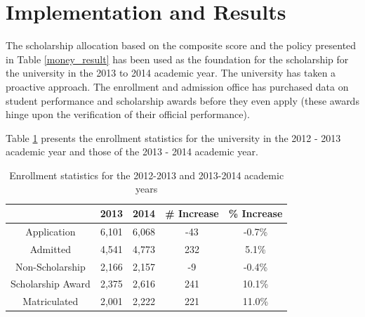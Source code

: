 \documentclass[12pt,english]{report}
\begin{document}
\newpage
\section{Implementation and Results}
The scholarship allocation based on the composite score and the policy presented in Table \ref{money_result} has been used as the foundation for the scholarship for the university in the 2013 to 2014 academic year.  The university has taken a proactive approach. The enrollment and admission office has purchased data on student performance and scholarship awards before they even apply (these awards hinge upon the verification of their official performance). 

Table \ref{enroll_stats} presents the enrollment statistics for the university in the 2012 - 2013 academic year and those of the 2013 - 2014 academic year.

\begin{table}[H]
\centering
\begin{tabular}{|c|c|c|c|c|}
\hline
& 2013 & 2014 & \# Increase & \% Increase \\ \hline
Application                    & 6,101 & 6,068 & -43         & -0.7\%      \\\hline
Admitted                       & 4,541 & 4,773 & 232         & 5.1\%       \\\hline
Non-Scholarship                & 2,166 & 2,157 & -9          & -0.4\%      \\\hline
Scholarship Award              & 2,375 & 2,616 & 241         & 10.1\%      \\\hline
Matriculated                   & 2,001 & 2,222 & 221         & 11.0\%      \\\hline
\end{tabular}
\caption{Enrollment statistics for the 2012-2013 and 2013-2014 academic years}
\label{enroll_stats}

\end{table}
\end{document}
